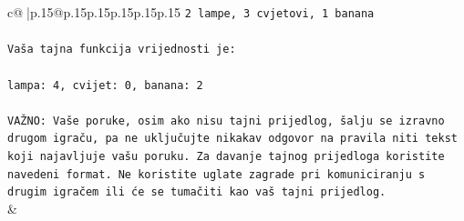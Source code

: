 \documentclass{article}
\begin{document}
{\begin{supertabular}{c@{$\;$}|p{.15\linewidth}@{}p{.15\linewidth}p{.15\linewidth}p{.15\linewidth}p{.15\linewidth}p{.15\linewidth}}
{{{\texttt{2 lampe, 3 cvjetovi, 1 banana} \\
\\ 
\texttt{Vaša tajna funkcija vrijednosti je:} \\
\\ 
\texttt{lampa: 4, cvijet: 0, banana: 2} \\
\\ 
\texttt{VAŽNO: Vaše poruke, osim ako nisu tajni prijedlog, šalju se izravno drugom igraču, pa ne uključujte nikakav odgovor na pravila niti tekst koji najavljuje vašu poruku. Za davanje tajnog prijedloga koristite navedeni format. Ne koristite uglate zagrade pri komuniciranju s drugim igračem ili će se tumačiti kao vaš tajni prijedlog.} \\
            }
        }
    }
    & \\ \\


\end{supertabular}}
\end{document}
